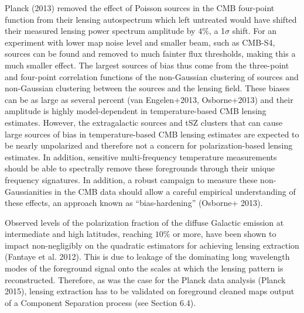 Planck (2013) removed the effect of Poisson sources in the CMB four-point function from their lensing autospectrum which left untreated would have shifted their measured lensing power spectrum amplitude by $4\%$, a  1$\sigma$ shift.  For an experiment with lower map noise level and smaller beam, such as CMB-S4, sources can be found and removed to much fainter flux thresholds, making this
a much smaller effect.  The largest sources of bias thus come from the three-point and four-point correlation functions of the non-Gaussian clustering
of sources and non-Gaussian clustering between the sources and the lensing field.  These biases can be as large as several percent (van Engelen+2013, Osborne+2013) and their amplitude is highly model-dependent in temperature-based CMB lensing estimates. However, the extragalactic sources and tSZ clusters that can cause large sources of bias in temperature-based CMB lensing estimates are expected to be nearly unpolarized and therefore not a concern for polarization-based lensing estimates. In
addition, sensitive multi-frequency temperature measurements should be
able to spectrally remove these foregrounds through their unique frequency
signatures. In addition, a robust campaign to measure these non-Gaussianities
in the CMB data should allow a careful empirical understanding of these
effects, an approach known as ``bias-hardening'' (Osborne+ 2013).  

Observed levels of the polarization fraction of the diffuse Galactic emission at intermediate and high latitudes, reaching $10\%$ or more, 
have been shown to impact non-negligibly on the quadratic estimators for achieving lensing extraction (Fantaye et al. 2012). %
This is due to leakage of the dominating long wavelength modes of the foreground signal onto the scales at which the lensing pattern is reconstructed. 
Therefore, as was the case for the Planck data analysis 
(Planck 2015), lensing extraction has to be validated on foreground 
cleaned maps output of a Component Separation process (see Section 6.4). 



